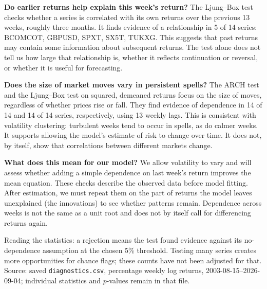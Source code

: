 \par\textbf{Do earlier returns help explain this week's return?} The Ljung--Box test checks whether a series is correlated with its own returns over the previous 13 weeks, roughly three months. It finds evidence of a relationship in 5 of 14 series: BCOMCOT, GBPUSD, SPXT, SX5T, TUKXG. This suggests that past returns may contain some information about subsequent returns. The test alone does not tell us how large that relationship is, whether it reflects continuation or reversal, or whether it is useful for forecasting.

\par\textbf{Does the size of market moves vary in persistent spells?} The ARCH test and the Ljung--Box test on squared, demeaned returns focus on the size of moves, regardless of whether prices rise or fall. They find evidence of dependence in 14 of 14 and 14 of 14 series, respectively, using 13 weekly lags. This is consistent with volatility clustering: turbulent weeks tend to occur in spells, as do calmer weeks. It supports allowing the model's estimate of risk to change over time. It does not, by itself, show that correlations between different markets change.

\par\textbf{What does this mean for our model?} We allow volatility to vary and will assess whether adding a simple dependence on last week's return improves the mean equation. These checks describe the observed data before model fitting. After estimation, we must repeat them on the part of returns the model leaves unexplained (the innovations) to see whether patterns remain. Dependence across weeks is not the same as a unit root and does not by itself call for differencing returns again.

\par{\footnotesize Reading the statistics: a rejection means the test found evidence against its no-dependence assumption at the chosen 5\% threshold. Testing many series creates more opportunities for chance flags; these counts have not been adjusted for that. Source: saved \texttt{diagnostics.csv}, percentage weekly log returns, 2003-08-15--2026-09-04; individual statistics and $p$-values remain in that file.}
